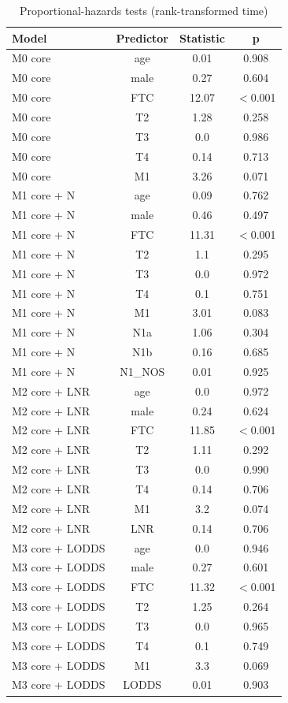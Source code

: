 \begin{table}[htbp]
\caption{Proportional-hazards tests (rank-transformed time)}\label{tab:s7_ph_tests}
\scriptsize
\begin{tabular*}{\textwidth}{@{\extracolsep{\fill}}lccc@{}}
\toprule
Model & Predictor & Statistic & p \\
\midrule
M0 core & age & 0.01 & 0.908 \\
M0 core & male & 0.27 & 0.604 \\
M0 core & FTC & 12.07 & $<$0.001 \\
M0 core & T2 & 1.28 & 0.258 \\
M0 core & T3 & 0.0 & 0.986 \\
M0 core & T4 & 0.14 & 0.713 \\
M0 core & M1 & 3.26 & 0.071 \\
M1 core + N & age & 0.09 & 0.762 \\
M1 core + N & male & 0.46 & 0.497 \\
M1 core + N & FTC & 11.31 & $<$0.001 \\
M1 core + N & T2 & 1.1 & 0.295 \\
M1 core + N & T3 & 0.0 & 0.972 \\
M1 core + N & T4 & 0.1 & 0.751 \\
M1 core + N & M1 & 3.01 & 0.083 \\
M1 core + N & N1a & 1.06 & 0.304 \\
M1 core + N & N1b & 0.16 & 0.685 \\
M1 core + N & N1\_NOS & 0.01 & 0.925 \\
M2 core + LNR & age & 0.0 & 0.972 \\
M2 core + LNR & male & 0.24 & 0.624 \\
M2 core + LNR & FTC & 11.85 & $<$0.001 \\
M2 core + LNR & T2 & 1.11 & 0.292 \\
M2 core + LNR & T3 & 0.0 & 0.990 \\
M2 core + LNR & T4 & 0.14 & 0.706 \\
M2 core + LNR & M1 & 3.2 & 0.074 \\
M2 core + LNR & LNR & 0.14 & 0.706 \\
M3 core + LODDS & age & 0.0 & 0.946 \\
M3 core + LODDS & male & 0.27 & 0.601 \\
M3 core + LODDS & FTC & 11.32 & $<$0.001 \\
M3 core + LODDS & T2 & 1.25 & 0.264 \\
M3 core + LODDS & T3 & 0.0 & 0.965 \\
M3 core + LODDS & T4 & 0.1 & 0.749 \\
M3 core + LODDS & M1 & 3.3 & 0.069 \\
M3 core + LODDS & LODDS & 0.01 & 0.903 \\
\bottomrule
\end{tabular*}
\end{table}

